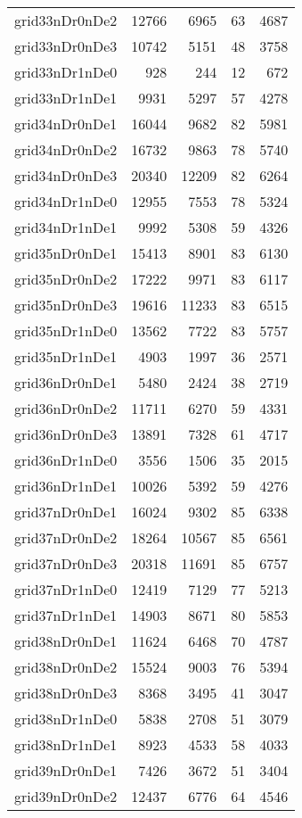 \documentclass[../../../thesis.tex]{subfiles}
\begin{document}
\begin{longtable}{lrrrr}
grid33nDr0nDe2 & 12766 & 6965 & 63 & 4687 \\
grid33nDr0nDe3 & 10742 & 5151 & 48 & 3758 \\
grid33nDr1nDe0 & 928 & 244 & 12 & 672 \\
grid33nDr1nDe1 & 9931 & 5297 & 57 & 4278 \\
grid34nDr0nDe1 & 16044 & 9682 & 82 & 5981 \\
grid34nDr0nDe2 & 16732 & 9863 & 78 & 5740 \\
grid34nDr0nDe3 & 20340 & 12209 & 82 & 6264 \\
grid34nDr1nDe0 & 12955 & 7553 & 78 & 5324 \\
grid34nDr1nDe1 & 9992 & 5308 & 59 & 4326 \\
grid35nDr0nDe1 & 15413 & 8901 & 83 & 6130 \\
grid35nDr0nDe2 & 17222 & 9971 & 83 & 6117 \\
grid35nDr0nDe3 & 19616 & 11233 & 83 & 6515 \\
grid35nDr1nDe0 & 13562 & 7722 & 83 & 5757 \\
grid35nDr1nDe1 & 4903 & 1997 & 36 & 2571 \\
grid36nDr0nDe1 & 5480 & 2424 & 38 & 2719 \\
grid36nDr0nDe2 & 11711 & 6270 & 59 & 4331 \\
grid36nDr0nDe3 & 13891 & 7328 & 61 & 4717 \\
grid36nDr1nDe0 & 3556 & 1506 & 35 & 2015 \\
grid36nDr1nDe1 & 10026 & 5392 & 59 & 4276 \\
grid37nDr0nDe1 & 16024 & 9302 & 85 & 6338 \\
grid37nDr0nDe2 & 18264 & 10567 & 85 & 6561 \\
grid37nDr0nDe3 & 20318 & 11691 & 85 & 6757 \\
grid37nDr1nDe0 & 12419 & 7129 & 77 & 5213 \\
grid37nDr1nDe1 & 14903 & 8671 & 80 & 5853 \\
grid38nDr0nDe1 & 11624 & 6468 & 70 & 4787 \\
grid38nDr0nDe2 & 15524 & 9003 & 76 & 5394 \\
grid38nDr0nDe3 & 8368 & 3495 & 41 & 3047 \\
grid38nDr1nDe0 & 5838 & 2708 & 51 & 3079 \\
grid38nDr1nDe1 & 8923 & 4533 & 58 & 4033 \\
grid39nDr0nDe1 & 7426 & 3672 & 51 & 3404 \\
grid39nDr0nDe2 & 12437 & 6776 & 64 & 4546 \\

\end{longtable}
\end{document}
